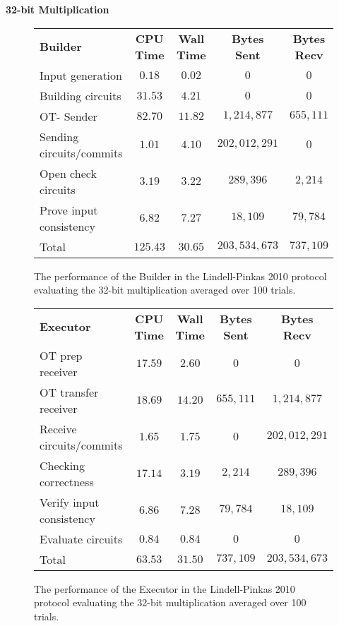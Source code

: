 \documentclass[ %
                    author={Nicholas Tutte},
                supervisor={Prof. Nigel Smart},
                    degree={MEng},
                     title={Secure Two Party Computation},
                  subtitle={A practical comparison of recent protocols},
                      type={Research - GG1K},
                      year={2015} ]{dissertation}
\begin{document}
				\FloatBarrier
				\noindent \textbf{32-bit Multiplication}
				\begin{figure}[!ht]
					\begin{tabular}{| p{4.3cm} | c c c c |}
						\hline
						\textbf{Builder} & \textbf{CPU Time} & \textbf{Wall Time} & \textbf{Bytes Sent} & \textbf{Bytes Recv} \\
						\thickhline
						Input generation & $0.18$ & $0.02$ & $0$ & $0$ \\
						\hline
						Building circuits & $31.53$ & $4.21$ & $0$ & $0$ \\
						\hline
						OT- Sender & $82.70$ & $11.82$ & $1,214,877$ & $655,111$ \\
						\hline
						Sending circuits/commits & $1.01$ & $4.10$ & $202,012,291$ & $0$ \\
						\hline
						Open check circuits & $3.19$ & $3.22$ & $289,396$ & $2,214$ \\
						\hline
						Prove input consistency & $6.82$ & $7.27$ & $18,109$ & $79,784$ \\
						\thickhline
						Total & $125.43$ & $30.65$ & $203,534,673$ & $737,109$ \\
						\hline
					\end{tabular}

					\caption{The performance of the Builder in the Lindell-Pinkas 2010 protocol evaluating the 32-bit multiplication averaged over 100 trials. \label{table:LP_2010_Mul_Builder}}
				\end{figure}
				
				\begin{figure}[!ht]
					\begin{tabular}{| p{4.3cm} | c c c c |}
						\hline
						\textbf{Executor} & \textbf{CPU Time} & \textbf{Wall Time} & \textbf{Bytes Sent} & \textbf{Bytes Recv} \\
						\thickhline
						OT prep receiver & $17.59$ & $2.60$ & $0$ & $0$ \\
						\hline
						OT transfer receiver & $18.69$ & $14.20$ & $655,111$ & $1,214,877$ \\
						\hline
						Receive circuits/commits & $1.65$ & $1.75$ & $0$ & $202,012,291$ \\
						\hline
						Checking correctness & $17.14$ & $3.19$ & $2,214$ & $289,396$ \\
						\hline
						Verify input consistency & $6.86$ & $7.28$ & $79,784$ & $18,109$ \\
						\hline
						Evaluate circuits & $0.84$ & $0.84$ & $0$ & $0$ \\
						\thickhline
						Total & $63.53$ & $31.50$ & $737,109$ & $203,534,673$ \\
						\hline
					\end{tabular}
					\caption{The performance of the Executor in the Lindell-Pinkas 2010 protocol evaluating the 32-bit multiplication averaged over 100 trials. \label{table:LP_2010_Mul_Executor}}
				\end{figure}
				\FloatBarrier
\end{document}
